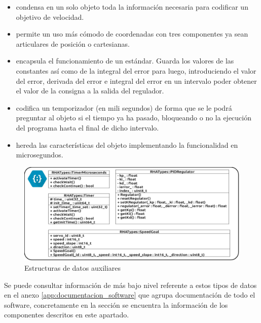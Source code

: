         \begin{itemize}
            \item {} condensa en un solo objeto toda la información necesaria para codificar un objetivo de velocidad.
            \item {} permite un uso más cómodo de coordenadas con tres componentes ya sean articulares de posición o cartesianas.
            \item {} encapsula el funcionamiento de un  estándar. Guarda los valores de las constantes así como de la integral del error para luego, introduciendo el valor del error, derivada del error e integral del error en un intervalo poder obtener el valor de la consigna a la salida del regulador.
            \item {} codifica un temporizador (en mili segundos) de forma que se le podrá preguntar al objeto si el tiempo ya ha pasado, bloqueando o no la ejecución del programa hasta el final de dicho intervalo.
            \item {} hereda las características del objeto  implementando la funcionalidad en microsegundos.
        \end{itemize}

        \begin{figure}[H]
            \centering
            \includegraphics[width=1\textwidth]{figuras/Imagenes_SW/class_diagram_TRHA.jpg}
            \caption{Estructuras de datos auxiliares }
            \label{fig:SW:class_diagram_TRHA}
        \end{figure}

        Se puede consultar información de más bajo nivel referente a estos tipos de datos en el anexo \ref{app:documentacion_software} que agrupa documentación de todo el software, concretamente en la sección \completar se encuentra la información de los componentes descritos en este apartado.


